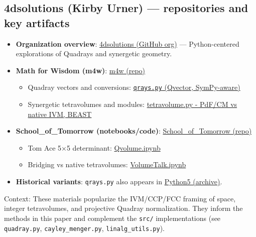 \documentclass[
  10pt,
]{article}
\providecommand{\tightlist}{%
  \setlength{\itemsep}{0pt}\setlength{\parskip}{0pt}}
\begin{document}
\hypertarget{dsolutions-kirby-urner-repositories-and-key-artifacts}{%
\subsection{4dsolutions (Kirby Urner) --- repositories and key
artifacts}\label{dsolutions-kirby-urner-repositories-and-key-artifacts}}

\begin{itemize}
\tightlist
\item
  \textbf{Organization overview}:
  \href{https://github.com/4dsolutions}{4dsolutions (GitHub org)} ---
  Python-centered explorations of Quadrays and synergetic geometry.
\item
  \textbf{Math for Wisdom (m4w)}:
  \href{https://github.com/4dsolutions/m4w}{m4w (repo)}

  \begin{itemize}
  \tightlist
  \item
    Quadray vectors and conversions:
    \href{https://github.com/4dsolutions/m4w/blob/main/qrays.py}{\texttt{qrays.py}
    (Qvector, SymPy-aware)}
  \item
    Synergetic tetravolumes and modules:
    \href{https://github.com/4dsolutions/m4w/blob/main/tetravolume.py}{tetravolume.py
    - PdF/CM vs native IVM, BEAST}
  \end{itemize}
\item
  \textbf{School\_of\_Tomorrow (notebooks/code)}:
  \href{https://github.com/4dsolutions/School_of_Tomorrow}{School\_of\_Tomorrow
  (repo)}

  \begin{itemize}
  \tightlist
  \item
    Tom Ace 5×5 determinant:
    \href{https://github.com/4dsolutions/School_of_Tomorrow/blob/master/Qvolume.ipynb}{Qvolume.ipynb}
  \item
    Bridging vs native tetravolumes:
    \href{https://github.com/4dsolutions/School_of_Tomorrow/blob/master/VolumeTalk.ipynb}{VolumeTalk.ipynb}
  \end{itemize}
\item
  \textbf{Historical variants}: \texttt{qrays.py} also appears in
  \href{https://github.com/4dsolutions/Python5/blob/master/qrays.py}{Python5
  (archive)}.
\end{itemize}

Context: These materials popularize the IVM/CCP/FCC framing of space,
integer tetravolumes, and projective Quadray normalization. They inform
the methods in this paper and complement the \texttt{src/}
implementations (see \texttt{quadray.py}, \texttt{cayley\_menger.py},
\texttt{linalg\_utils.py}).
\end{document}
